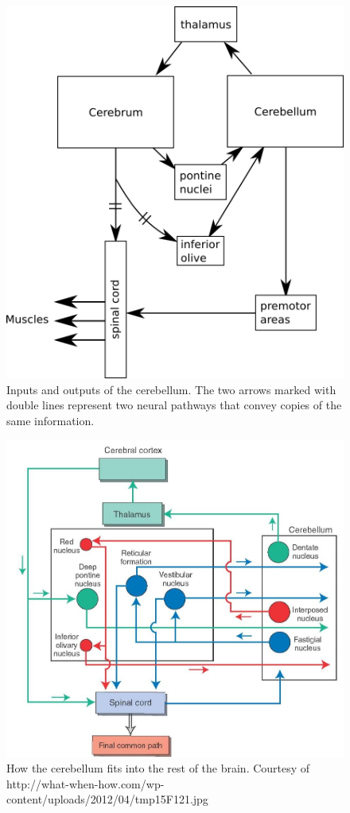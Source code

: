 \documentclass{article}
\theoremstyle{definition}
\begin{document}
\begin{figure}
\includegraphics[width=\linewidth]{organization.png}
\caption{Inputs and outputs of the cerebellum. The two arrows marked
  with double lines represent two neural pathways that convey copies
  of the same information.}
\label{fig-organization}
\end{figure}

\begin{figure}
\includegraphics[width=\linewidth]{nanohub/global.png}
\caption{How the cerebellum fits into the rest of the brain. Courtesy
  of
  http://what-when-how.com/wp-content/uploads/2012/04/tmp15F121.jpg}
\label{fig-global}
\end{figure}
\end{document}
